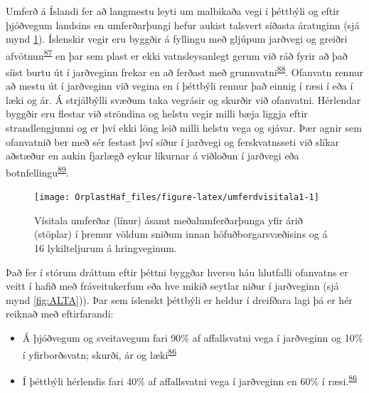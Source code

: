 \documentclass[icelandic,]{book}
\providecommand{\tightlist}{%
  \setlength{\itemsep}{0pt}\setlength{\parskip}{0pt}}
\begin{document}
Umferð á Íslandi fer að langmestu leyti um malbikaða vegi í þéttbýli og eftir þjóðvegum landsins en umferðarþungi hefur aukist talsvert síðasta áratuginn (sjá mynd \ref{fig:umferdvisitala1}). Íslenskir vegir eru byggðir á fyllingu með gljúpum jarðvegi og greiðri afvötnun\textsuperscript{\protect\hyperlink{ref-Matinupa2012Summary}{87}} en þar sem plast er ekki vatnsleysanlegt gerum við ráð fyrir að það síist burtu út í jarðveginn frekar en að ferðast með grunnvatni\textsuperscript{\protect\hyperlink{ref-ECHA2016}{88}}. Ofanvatn rennur að mestu út í jarðveginn við vegina en í þéttbýli rennur það einnig í ræsi í eða í læki og ár. Á strjálbýlli svæðum taka vegrásir og skurðir við ofanvatni. Hérlendar byggðir eru flestar við ströndina og helstu vegir milli bæja liggja eftir strandlengjunni og er því ekki löng leið milli helstu vega og sjávar. Þær agnir sem ofanvatnið ber með sér festast því síður í jarðvegi og ferskvatnsseti við slíkar aðstæður en aukin fjarlægð eykur líkurnar á viðloðun í jarðvegi eða botnfellingu\textsuperscript{\protect\hyperlink{ref-BESSELING2017540}{89}}.

\begin{figure}

{\centering \texttt{[image: OrplastHaf\_files/figure-latex/umferdvisitala1-1]} 

}

\caption{Vísitala umferðar (línur) ásamt meðalumferðarþunga yfir árið (stöplar) í þremur völdum sniðum innan höfuðborgarsvæðisins og á 16 lykilteljurum á hringveginum.}\label{fig:umferdvisitala1}
\end{figure}

Það fer í stórum dráttum eftir þéttni byggðar hversu háu hlutfalli ofanvatns er veitt í hafið með fráveitukerfum eða hve mikið seytlar niður í jarðveginn (sjá mynd \ref{fig:ALTA})). Þar sem íslenskt þéttbýli er heldur í dreifðara lagi þá er hér reiknað með eftirfarandi:

\begin{itemize}
\tightlist
\item
  Á þjóðvegum og sveitavegum fari 90\% af affallsvatni vega í jarðveginn og 10\% í yfirborðsvatn; skurði, ár og læki\textsuperscript{\protect\hyperlink{ref-Verschoor2016}{86}}
\item
  Í þéttbýli hérlendis fari 40\% af affallsvatni vega í jarðveginn en 60\% í ræsi.\textsuperscript{\protect\hyperlink{ref-Verschoor2016}{86}}
\end{itemize}
\end{document}
